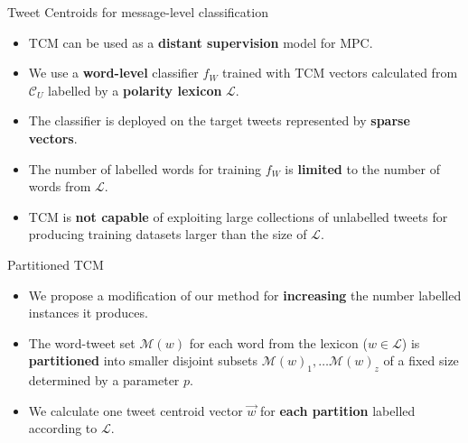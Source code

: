 \documentclass[handout]{beamer}
\begin{document}
\begin{frame}{Tweet Centroids for message-level classification}
\begin{scriptsize}
\begin{itemize}
\item TCM can be used as a \textbf{distant supervision} model for MPC.
\item We use a \textbf{word-level} classifier $f_W$ trained with TCM vectors calculated from $\mathcal{C}_U$ labelled by a \textbf{polarity lexicon} $\mathcal{L}$. 
\item The classifier is deployed on the target tweets represented by \textbf{sparse vectors}.
\item The number of labelled words for training $f_W$ is \textbf{limited} to the number of words from $\mathcal{L}$.
\item TCM is \textbf{not capable} of exploiting large collections of unlabelled tweets for producing training datasets larger than the size of $\mathcal{L}$. 
\end{itemize}
\end{scriptsize}
\end{frame}

\begin{frame}{Partitioned TCM}
\begin{scriptsize}
\begin{itemize}
\item We propose a modification of our method for \textbf{increasing} the number labelled instances it produces. 
\item  The word-tweet set $\mathcal{M}(w)$ for each word from the lexicon ($w \in\mathcal{L}$) is \textbf{partitioned} into smaller disjoint subsets $\mathcal{M}(w)_1, \dots \mathcal{M}(w)_z$ of a fixed size determined by a parameter $p$. 
\item We calculate one tweet centroid vector $\overrightarrow{w}$ for \textbf{each partition} labelled according to $\mathcal{L}$.
\end{itemize}
\end{scriptsize}
\end{frame}
\end{document}
